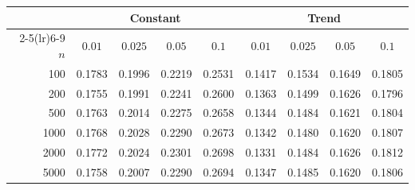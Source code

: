 \begin{tabular}{rcccccccc}
\toprule
& \multicolumn{4}{c}{Constant} & \multicolumn{4}{c}{Trend}\\
\cmidrule(lr){2-5}\cmidrule(lr){6-9}
$n$ & $0.01$ & $0.025$ & $0.05$ & $0.1$ & $0.01$ & $0.025$ & $0.05$ & $0.1$\\
\midrule
100 & 0.1783 & 0.1996 & 0.2219 & 0.2531 & 0.1417 & 0.1534 & 0.1649 & 0.1805 \\
200 & 0.1755 & 0.1991 & 0.2241 & 0.2600 & 0.1363 & 0.1499 & 0.1626 & 0.1796 \\
500 & 0.1763 & 0.2014 & 0.2275 & 0.2658 & 0.1344 & 0.1484 & 0.1621 & 0.1804 \\
1000 & 0.1768 & 0.2028 & 0.2290 & 0.2673 & 0.1342 & 0.1480 & 0.1620 & 0.1807 \\
2000 & 0.1772 & 0.2024 & 0.2301 & 0.2698 & 0.1331 & 0.1484 & 0.1626 & 0.1812 \\
5000 & 0.1758 & 0.2007 & 0.2290 & 0.2694 & 0.1347 & 0.1485 & 0.1620 & 0.1806 \\
\bottomrule
\end{tabular}

